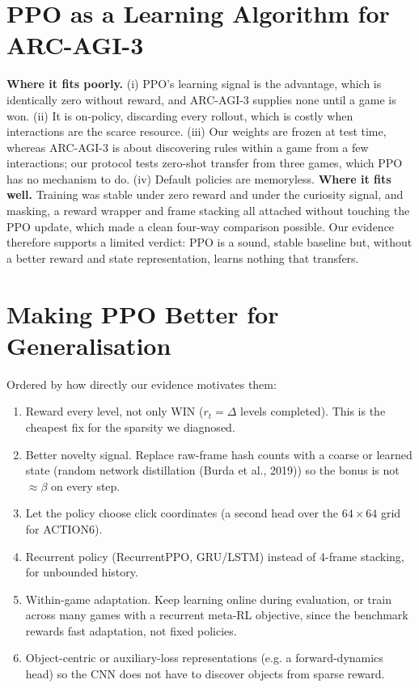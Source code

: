 \documentclass[11pt,a4paper]{article}
\begin{document}
\section{PPO as a Learning Algorithm for ARC-AGI-3}

\textbf{Where it fits poorly.} (i) PPO's learning signal is the advantage, which is identically zero without reward, and ARC-AGI-3 supplies none until a game is won. (ii) It is on-policy, discarding every rollout, which is costly when interactions are the scarce resource. (iii) Our weights are frozen at test time, whereas ARC-AGI-3 is about discovering rules within a game from a few interactions; our protocol tests zero-shot transfer from three games, which PPO has no mechanism to do. (iv) Default policies are memoryless. \textbf{Where it fits well.} Training was stable under zero reward and under the curiosity signal, and masking, a reward wrapper and frame stacking all attached without touching the PPO update, which made a clean four-way comparison possible. Our evidence therefore supports a limited verdict: PPO is a sound, stable baseline but, without a better reward and state representation, learns nothing that transfers.

\section{Making PPO Better for Generalisation}

Ordered by how directly our evidence motivates them:
\begin{enumerate}
  \item Reward every level, not only WIN ($r_t=\Delta$ levels completed). This is the cheapest fix for the sparsity we diagnosed.
  \item Better novelty signal. Replace raw-frame hash counts with a coarse or learned state (random network distillation (Burda et al., 2019)) so the bonus is not $\approx\beta$ on every step.
  \item Let the policy choose click coordinates (a second head over the $64\times64$ grid for ACTION6).
  \item Recurrent policy (RecurrentPPO, GRU/LSTM) instead of 4-frame stacking, for unbounded history.
  \item Within-game adaptation. Keep learning online during evaluation, or train across many games with a recurrent meta-RL objective, since the benchmark rewards fast adaptation, not fixed policies.
  \item Object-centric or auxiliary-loss representations (e.g. a forward-dynamics head) so the CNN does not have to discover objects from sparse reward.
\end{enumerate}
\end{document}
